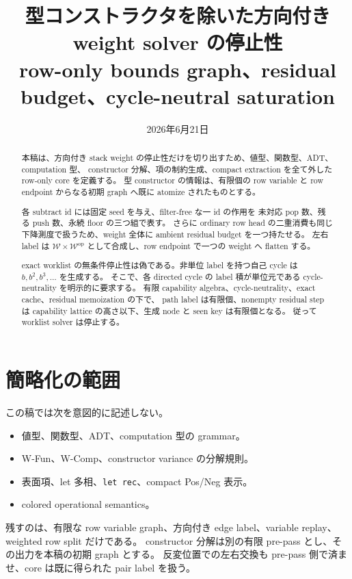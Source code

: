 \documentclass[uplatex,dvipdfmx,a4paper,10.5pt]{jsarticle}
\title{型コンストラクタを除いた方向付き weight solver の停止性\\
\large row-only bounds graph、residual budget、cycle-neutral saturation}
\author{}
\date{2026年6月21日}
\theoremstyle{jpplain}
\newcommand{\Weight}{\mathcal W}
\begin{document}
\maketitle

\begin{abstract}
本稿は、方向付き stack weight の停止性だけを切り出すため、値型、関数型、ADT、computation 型、
constructor 分解、項の制約生成、compact extraction を全て外した row-only core を定義する。
型 constructor の情報は、有限個の row variable と row endpoint からなる初期 graph へ既に atomize されたものとする。

各 subtract id には固定 seed を与え、filter-free な一 id の作用を
未対応 pop 数、残る push 数、永続 floor の三つ組で表す。
さらに ordinary row head の二重消費も同じ下降測度で扱うため、weight 全体に ambient residual budget を一つ持たせる。
左右 label は $\Weight\times\Weight^{\mathrm{op}}$ として合成し、row endpoint で一つの weight へ flatten する。

exact worklist の無条件停止性は偽である。非単位 label を持つ自己 cycle は
$b,b^2,b^3,\ldots$ を生成する。
そこで、各 directed cycle の label 積が単位元である cycle-neutrality を明示的に要求する。
有限 capability algebra、cycle-neutrality、exact cache、residual memoization の下で、
path label は有限個、nonempty residual step は capability lattice の高さ以下、生成 node と seen key は有限個となる。
従って worklist solver は停止する。
\end{abstract}

\tableofcontents

\section{簡略化の範囲}

この稿では次を意図的に記述しない。

\begin{itemize}
  \item 値型、関数型、ADT、computation 型の grammar。
  \item W-Fun、W-Comp、constructor variance の分解規則。
  \item 表面項、let 多相、\texttt{let rec}、compact Pos/Neg 表示。
  \item colored operational semantics。
\end{itemize}

残すのは、有限な row variable graph、方向付き edge label、variable replay、weighted row split だけである。
constructor 分解は別の有限 pre-pass とし、その出力を本稿の初期 graph とする。
反変位置での左右交換も pre-pass 側で済ませ、core は既に得られた pair label を扱う。
\end{document}
